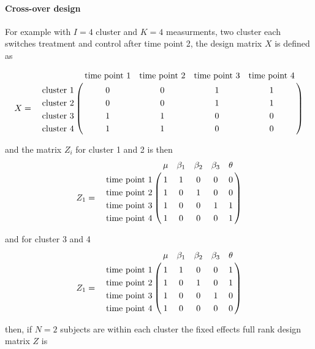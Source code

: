 \documentclass{article}
\begin{document}
\paragraph{Cross-over design}

For example with $I=4$ cluster and $K=4$ measurments, two cluster each switches treatment and control after time point 2, the design matrix $X$ is defined as

\begin{eqnarray*}
  X &=&  \bordermatrix{
  					& \textrm{time point 1}	& \textrm{time point 2} & \textrm{time point 3} & \textrm{time point 4} \cr
\textrm{cluster 1} 	& 0&0	&1&1\cr
\textrm{cluster 2}	& 0&0	&1&1\cr
\textrm{cluster 3}  & 1&1	&0&0\cr
\textrm{cluster 4}  & 1&1  &0&0\cr
}
\end{eqnarray*}


and the matrix $Z_{i}$ for cluster 1 and 2 is then 
\begin{eqnarray*}
Z_{1} &=&  \bordermatrix{
  						& \mu	&\beta_{1}	& \beta_{2}	& \beta_{3}  &\theta\cr
\textrm{time point 1} 	& 1		&1			&0		 	& 0& 0\cr
\textrm{time point 2} 	&1 		&0 			&1			& 0& 0\cr
\textrm{time point 3}	&1 		&0			&0			& 1& 1\cr
\textrm{time point 4}  &1 		&0			&0		&0	& 1\cr
}
\end{eqnarray*}

and for cluster 3 and 4  
\begin{eqnarray*}
Z_{1} &=&  \bordermatrix{
    					& \mu	&\beta_{1}	& \beta_{2}	& \beta_{3}  &\theta\cr
\textrm{time point 1} 	& 1		&1			&0		 	& 0& 1\cr
\textrm{time point 2} 	&1 		&0 			&1			& 0& 1\cr
\textrm{time point 3}	&1 		&0			&0			& 1& 0\cr
\textrm{time point 4}  &1 		&0			&0		&0	& 0\cr
}
\end{eqnarray*}

then, if $N=2$ subjects are within each cluster the fixed effects full rank design matrix $Z$ is 
\end{document}
